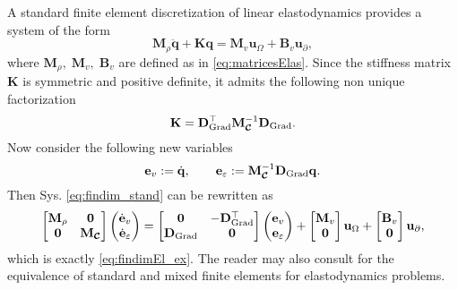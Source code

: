 	\begin{remark}
		A standard finite element discretization of linear elastodynamics provides a system of the form
		\begin{equation}\label{eq:findim_stand}
		\mathbf{M}_\rho \ddot{\mathbf{q}} + \mathbf{K} \mathbf{q} = \mathbf{M}_{v}\mathbf{u}_\Omega + \mathbf{B}_{v}\mathbf{u}_\partial,
		\end{equation}
		where $\mathbf{M}_\rho, \; \mathbf{M}_{v}, \; \mathbf{B}_{v}$ are defined as in \eqref{eq:matricesElas}. Since the stiffness matrix $\mathbf{K}$ is symmetric and positive definite, it admits the following non unique factorization \cite{horn2012matrix}
		\begin{equation*} 
		\mathbf{K} = \mathbf{D}_{\operatorname*{Grad}}^\top \mathbf{M}_{\bm{\mathcal{C}}}^{-1} \mathbf{D}_{\operatorname*{Grad}}.
		\end{equation*}
		Now consider the following new variables
		\begin{equation*}
		\mathbf{e}_v := \dot{\mathbf{q}}, \qquad 
		\mathbf{e}_\varepsilon := \mathbf{M}_{\bm{\mathcal{C}}}^{-1} \mathbf{D}_{\operatorname*{Grad}}{\mathbf{q}}. 
		\end{equation*}
		Then Sys. \eqref{eq:findim_stand} can be rewritten as
		\begin{equation}
		\begin{bmatrix}
		\mathbf{M}_\rho & \mathbf{0} \\
		\mathbf{0} & \mathbf{M}_{\bm{\mathcal{C}}} \\
		\end{bmatrix}
		\begin{pmatrix}
		\dot{\mathbf{e}}_v \\
		\dot{\mathbf{e}}_\varepsilon \\
		\end{pmatrix} = \begin{bmatrix}
		\mathbf{0} & -\mathbf{D}_{\operatorname*{Grad}}^\top \\
		\mathbf{D}_{\operatorname*{Grad}} & \mathbf{0} \\
		\end{bmatrix}
		\begin{pmatrix}
		\mathbf{e}_{v} \\
		\mathbf{e}_{\varepsilon} \\
		\end{pmatrix} + 
		\begin{bmatrix}
		\mathbf{M}_{v}\\
		\mathbf{0}\\
		\end{bmatrix}
		\mathbf{u}_\Omega
		+ 
		\begin{bmatrix}
		\mathbf{B}_{v}\\
		\mathbf{0}\\
		\end{bmatrix}
		\mathbf{u}_\partial,
		\end{equation}
		which is exactly \eqref{eq:findimEl_ex}. The reader may also consult \cite[Theorem 2]{cohen2005} for the equivalence of standard and mixed finite elements for elastodynamics problems.
	\end{remark}



